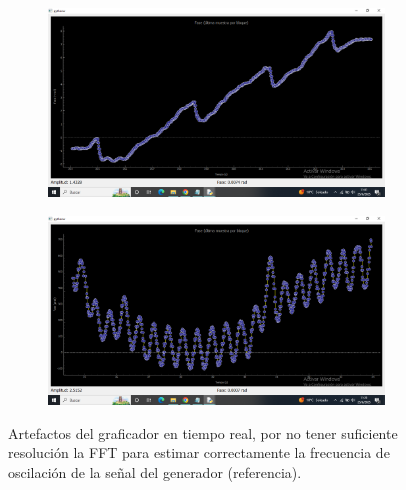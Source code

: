 \begin{figure}[!ht]
	\begin{minipage}[c]{0.5\textwidth}
			\begin{subfigure}{\textwidth}
					\centering
					\includegraphics[width=0.98\textwidth]{Figures/23_06_2025/Saltos_cada_60_Hz_tiempo_real.png}
					\captionsetup{width=0.8\textwidth}
				\end{subfigure}
		\end{minipage}\begin{minipage}[c]{0.49\textwidth}
			\begin{subfigure}{\textwidth}
					\centering
					\includegraphics[width=0.98\textwidth]{Figures/23_06_2025/Oscilaciones_tiempo_Real.png}
					\captionsetup{width=0.8\textwidth}
				\end{subfigure}
		\end{minipage}
	\caption{Artefactos del graficador en tiempo real, por no tener suficiente resolución la FFT para estimar correctamente la frecuencia de oscilación de la señal del generador (referencia).}
	\label{fig:artifacts_real_time_grapher_lock_in}
\end{figure}


